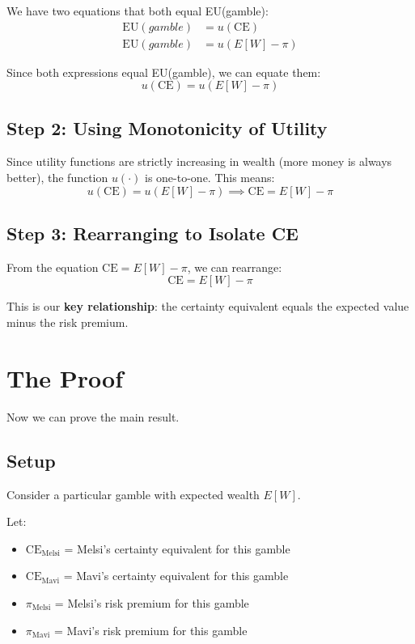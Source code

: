 \documentclass[11pt]{article}
\theoremstyle{definition}
\begin{document}
We have two equations that both equal EU(gamble):
\begin{align}
\text{EU}(gamble) &= u(\text{CE}) \label{eq:ce}\\
\text{EU}(gamble) &= u(E[W] - \pi) \label{eq:rp}
\end{align}

Since both expressions equal EU(gamble), we can equate them:
\[
u(\text{CE}) = u(E[W] - \pi)
\]

\subsection{Step 2: Using Monotonicity of Utility}

Since utility functions are strictly increasing in wealth (more money is always better), the function $u(\cdot)$ is one-to-one. This means:
\[
u(\text{CE}) = u(E[W] - \pi) \implies \text{CE} = E[W] - \pi
\]

\subsection{Step 3: Rearranging to Isolate CE}

From the equation $\text{CE} = E[W] - \pi$, we can rearrange:
\begin{equation}
\boxed{\text{CE} = E[W] - \pi} \label{eq:key}
\end{equation}

This is our \textbf{key relationship}: the certainty equivalent equals the expected value minus the risk premium.

\section{The Proof}

Now we can prove the main result.

\subsection{Setup}

Consider a particular gamble with expected wealth $E[W]$.

Let:
\begin{itemize}
\item $\text{CE}_{\text{Melsi}}$ = Melsi's certainty equivalent for this gamble
\item $\text{CE}_{\text{Mavi}}$ = Mavi's certainty equivalent for this gamble
\item $\pi_{\text{Melsi}}$ = Melsi's risk premium for this gamble
\item $\pi_{\text{Mavi}}$ = Mavi's risk premium for this gamble
\end{itemize}
\end{document}
